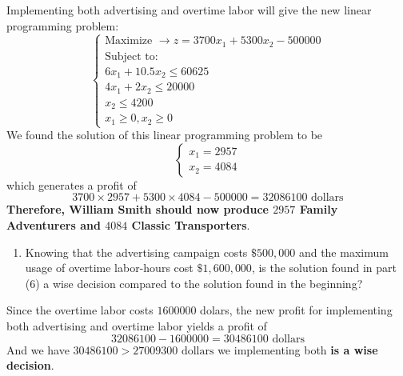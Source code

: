 \documentclass[
]{article}
\providecommand{\tightlist}{%
  \setlength{\itemsep}{0pt}\setlength{\parskip}{0pt}}
\begin{document}
Implementing both advertising and overtime labor will give the new
linear programming problem: \[
  \begin{cases}
        \text{Maximize  } \rightarrow z = 3700x_1 + 5300x_2 - 500000\\
        \text{Subject to:}\\
        6x_1 +10.5x_2 \leq 60625\\
        4x_1 + 2x_2 \leq 20000\\
        x_2 \leq 4200\\
        x_1 \geq 0, x_2 \geq 0
   \end{cases}
  \] We found the solution of this linear programming problem to be \[
  \begin{cases}
        x_1 = 2957\\ 
        x_2 = 4084
   \end{cases}
  \] which generates a profit of \[
  3700 \times 2957 + 5300 \times 4084 - 500000 = 32086100 \text{   dollars}
  \] \textbf{Therefore, William Smith should now produce \(2957\) Family
Adventurers and \(4084\) Classic Transporters}.

\begin{enumerate}
\def\labelenumi{\arabic{enumi}.}
\setcounter{enumi}{4}
\tightlist
\item
  Knowing that the advertising campaign costs \(\$ 500,000\) and the
  maximum usage of overtime labor-hours cost \(\$ 1,600,000\), is the
  solution found in part (6) a wise decision compared to the solution
  found in the beginning?
\end{enumerate}

Since the overtime labor costs \(1600000\) dolars, the new profit for
implementing both advertising and overtime labor yields a profit of \[
  32086100 - 1600000 = 30486100 \text{ dollars}
  \] And we have \(30486100 > 27009300 \text{ dollars}\) we implementing
both \textbf{is a wise decision}.
\end{document}
